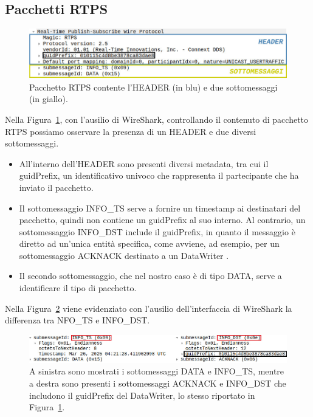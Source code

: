 \subsection{Pacchetti RTPS}


\begin{figure}[H]
    \centering
    \includegraphics[width=15.2cm, keepaspectratio]{img/Header e sottomessaggi esempio shapes2.jpg}
    \caption{Pacchetto RTPS contente l'HEADER (in blu) e due sottomessaggi (in giallo).}
    \label{headersubmessagedemo}
\end{figure}



Nella Figura~\ref{headersubmessagedemo}, con l'ausilio di WireShark,
controllando il contenuto di pacchetto RTPS possiamo osservare la presenza
di un HEADER e due diversi sottomessaggi. 
\begin{itemize}
    \item All'interno dell'HEADER sono presenti
    diversi metadata, tra cui il guidPrefix, un identificativo univoco che rappresenta
    il partecipante che ha inviato il pacchetto.
    \item Il sottomessaggio INFO\_TS serve a fornire un timestamp ai destinatari 
    del pacchetto,
    quindi non contiene un guidPrefix al 
    suo interno. Al contrario, un sottomessaggio INFO\_DST include
    il guidPrefix, in quanto il messaggio è diretto ad un'unica
    entità specifica, come avviene, ad esempio, per un sottomessaggio ACKNACK
    destinato a un DataWriter \cite{rtiwireshark}.
    \item Il secondo sottomessaggio, che nel nostro caso è di tipo DATA,
    serve a identificare il tipo di pacchetto.
\end{itemize}
Nella Figura~\ref{Info_ts e info_DST} viene evidenziato con 
l'ausilio dell'interfaccia di WireShark la differenza tra NFO\_TS e 
INFO\_DST.
\begin{figure}[H]
    \centering
    \includegraphics[width=15.2cm, keepaspectratio]{img/Info_ts e info_DST-Pagina-3.jpg}
    \caption{A sinistra sono mostrati i sottomessaggi DATA e INFO\_TS, 
    mentre a destra sono presenti i sottomessaggi ACKNACK e INFO\_DST che
    includono 
    il guidPrefix del DataWriter, lo stesso riportato in 
    Figura~\ref{headersubmessagedemo}.}
    \label{Info_ts e info_DST}
\end{figure}


